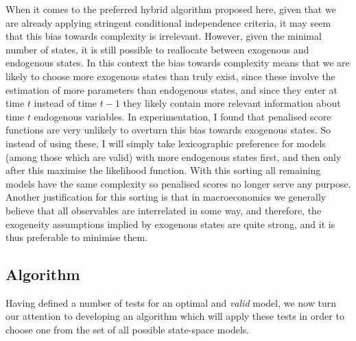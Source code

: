 \documentclass{article}
\begin{document}
When it comes to the preferred hybrid algorithm proposed here, given that we are already applying stringent conditional independence criteria, it may seem that this bias towards complexity is irrelevant. However, given the minimal number of states, it is still possible to reallocate between exogenous and endogenous states. In this context the bias towards complexity means that we are likely to choose more exogenous states than truly exist, since these involve the estimation of more parameters than endogenous states, and since they enter at time $t$ instead of time $t-1$ they likely contain more relevant information about time $t$ endogenous variables. In experimentation, I found that penalised score functions are very unlikely to overturn this bias towards exogenous states. So instead of using these, I will simply take lexicographic preference for models (among those which are valid) with more endogenous states first, and then only after this maximise the likelihood function. With this sorting all remaining models have the same complexity so penalised scores no longer serve any purpose. Another justification for this sorting is that in macroeconomics we generally believe that all observables are interrelated in some way, and therefore, the exogeneity assumptions implied by exogenous states are quite strong, and it is thus preferable to minimise them. 

\subsection{Algorithm} \label{algo}

Having defined a number of tests for an optimal and \textit{valid} model, we now turn our attention to developing an algorithm which will apply these tests in order to choose one from the set of all possible state-space models.

\vspace{0.5cm}
\end{document}

